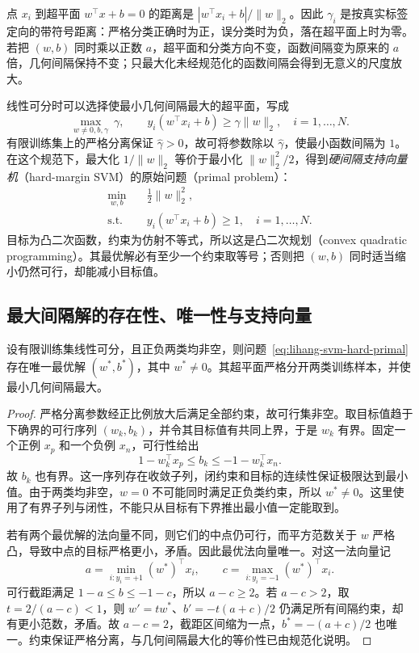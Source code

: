 点 $x_i$ 到超平面 $w^\top x+b=0$ 的距离是 $|w^\top x_i+b|/\lVert w\rVert_2$。因此 $\gamma_i$ 是按真实标签定向的带符号距离：严格分类正确时为正，误分类时为负，落在超平面上时为零。若把 $(w,b)$ 同时乘以正数 $a$，超平面和分类方向不变，函数间隔变为原来的 $a$ 倍，几何间隔保持不变；只最大化未经规范化的函数间隔会得到无意义的尺度放大。

线性可分时可以选择使最小几何间隔最大的超平面，写成
\[
  \max_{w\ne0,b,\gamma}\ \gamma,
  \qquad
  y_i(w^\top x_i+b)\ge\gamma\lVert w\rVert_2,
  \quad i=1,\ldots,N.
\]
有限训练集上的严格分离保证 $\widehat\gamma>0$，故可将参数除以 $\widehat\gamma$，使最小函数间隔为 $1$。在这个规范下，最大化 $1/\lVert w\rVert_2$ 等价于最小化 $\lVert w\rVert_2^2/2$，得到\emph{硬间隔支持向量机}（hard-margin SVM）的原始问题（primal problem）：
\begin{equation}
  \begin{aligned}
    \min_{w,b}\quad &\frac12\lVert w\rVert_2^2,\\
    \text{s.t.}\quad &y_i(w^\top x_i+b)\ge1,
      \quad i=1,\ldots,N.
  \end{aligned}
  \label{eq:lihang-svm-hard-primal}
\end{equation}
目标为凸二次函数，约束为仿射不等式，所以这是凸二次规划（convex quadratic programming）。其最优解必有至少一个约束取等号；否则把 $(w,b)$ 同时适当缩小仍然可行，却能减小目标值。

\subsection{最大间隔解的存在性、唯一性与支持向量}

\begin{theorem}[硬间隔解的存在唯一性]
\label{thm:lihang-svm-hard-unique}
设有限训练集线性可分，且正负两类均非空，则问题~\eqref{eq:lihang-svm-hard-primal} 存在唯一最优解 $(w^*,b^*)$，其中 $w^*\ne0$。其超平面严格分开两类训练样本，并使最小几何间隔最大。
\end{theorem}
\begin{proof}
严格分离参数经正比例放大后满足全部约束，故可行集非空。取目标值趋于下确界的可行序列 $(w_k,b_k)$，并令其目标值有共同上界，于是 $w_k$ 有界。固定一个正例 $x_p$ 和一个负例 $x_n$，可行性给出
\[
  1-w_k^\top x_p\le b_k\le-1-w_k^\top x_n.
\]
故 $b_k$ 也有界。这一序列存在收敛子列，闭约束和目标的连续性保证极限达到最小值。由于两类均非空，$w=0$ 不可能同时满足正负类约束，所以 $w^*\ne0$。这里使用了有界子列与闭性，不能只从目标有下界推出最小值一定能取到。

若有两个最优解的法向量不同，则它们的中点仍可行，而平方范数关于 $w$ 严格凸，导致中点的目标严格更小，矛盾。因此最优法向量唯一。对这一法向量记
\[
  a=\min_{i:y_i=+1}(w^*)^\top x_i,
  \qquad c=\max_{i:y_i=-1}(w^*)^\top x_i.
\]
可行截距满足 $1-a\le b\le-1-c$，所以 $a-c\ge2$。若 $a-c>2$，取 $t=2/(a-c)<1$，则 $w'=tw^*$、$b'=-t(a+c)/2$ 仍满足所有间隔约束，却有更小范数，矛盾。故 $a-c=2$，截距区间缩为一点，$b^*=-(a+c)/2$ 也唯一。约束保证严格分离，与几何间隔最大化的等价性已由规范化说明。
\end{proof}

